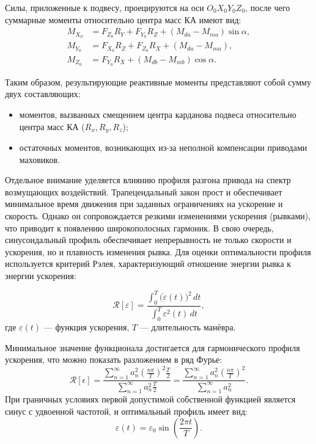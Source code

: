 Силы, приложенные к подвесу, проецируются на оси $O_0X_0Y_0Z_0$, после чего суммарные моменты относительно центра масс КА имеют вид:
\begin{equation*}
	\begin{aligned}
		M_{X_0} &= F_{Z_0}R_Y + F_{Y_0}R_Z + (M_{da}-M_{ma})\sin\alpha, \\
		M_{Y_0} &= F_{X_0}R_Z + F_{Z_0}R_X + (M_{da}-M_{ma}), \\
		M_{Z_0} &= F_{Y_0}R_X + (M_{db}-M_{mb})\cos\alpha.
	\end{aligned}
\end{equation*}

Таким образом, результирующие реактивные моменты представляют собой сумму двух составляющих: 
\begin{itemize}
	\item моментов, вызванных смещением центра карданова подвеса относительно центра масс КА ($R_x, R_y, R_z$);
	\item остаточных моментов, возникающих из-за неполной компенсации приводами маховиков.
\end{itemize}


Отдельное внимание уделяется влиянию профиля разгона привода на спектр возмущающих воздействий. Трапецеидальный закон прост и обеспечивает минимальное время движения  при заданных ограничениях на ускорение и скорость. Однако он сопровождается резкими изменениями ускорения (рывками), что приводит к появлению широкополосных гармоник. В свою очередь, синусоидальный профиль обеспечивает непрерывность не только скорости и ускорения, но и плавность изменения рывка. 
Для оценки оптимальности профиля используется критерий Рэлея, характеризующий отношение энергии рывка к энергии ускорения:

\begin{equation*}
	\label{eq:relay}
	\mathcal{R}[\varepsilon] =
	\frac{\displaystyle \int_{0}^{T} \bigl(\dot{\varepsilon}(t)\bigr)^{2}\,dt}
	{\displaystyle \int_{0}^{T} \varepsilon^{2}(t)\,dt},
\end{equation*}
где $\varepsilon(t)$ --- функция ускорения, $T$ --- длительность манёвра.

Минимальное значение функционала достигается для гармонического профиля ускорения, что можно показать разложением в ряд Фурье:
\begin{equation*}
	\mathcal{R}[\epsilon] =
	\frac{\displaystyle \sum_{n=1}^{\infty} a_n^2 \left(\frac{n \pi}{T}\right)^2 \frac{T}{2}}
	{\displaystyle \sum_{n=1}^{\infty} a_n^2 \frac{T}{2}}
	=
	\frac{\sum_{n=1}^{\infty} a_n^2 \left(\frac{n \pi}{T}\right)^2}
	{\sum_{n=1}^{\infty} a_n^2}.
\end{equation*}
При граничных условиях первой допустимой собственной функцией является синус с удвоенной частотой, и оптимальный профиль имеет вид:
\begin{equation*}
	\varepsilon(t) = \varepsilon_0 \sin\!\left(\frac{2\pi t}{T}\right).
\end{equation*}


